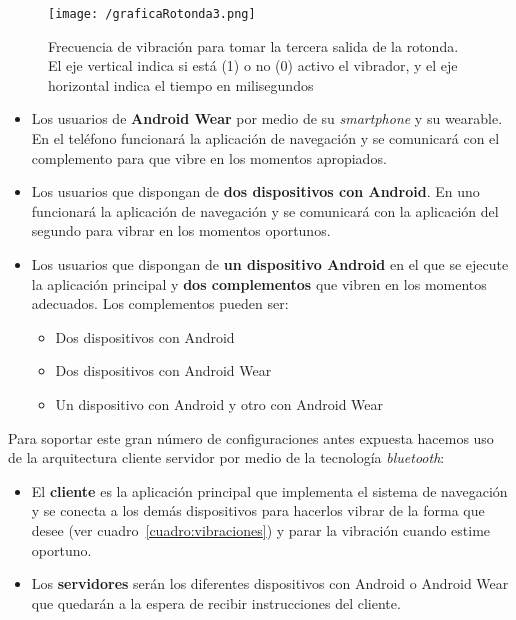 \begin{figure}[!h]
  \begin{center}
    \texttt{[image: /graficaRotonda3.png]}
    \caption{Frecuencia de vibración para tomar la tercera salida de la rotonda. El eje vertical
      indica si está (1) o no (0) activo el vibrador, y el eje horizontal indica el tiempo en
      milisegundos}
    \label{fig:graficaRotonda3}
  \end{center}
\end{figure}

\begin{itemize}
  \item Los usuarios de \textbf{Android Wear} por medio de su \emph{smartphone} y su {wearable}. En
    el teléfono funcionará la aplicación de navegación y se comunicará con el complemento para que
    vibre en los momentos apropiados.

  \item Los usuarios que dispongan de \textbf{dos dispositivos con Android}. En uno funcionará la
    aplicación de navegación y se comunicará con la aplicación del segundo para vibrar en los
    momentos oportunos.

  \item Los usuarios que dispongan de \textbf{un dispositivo Android} en el que se ejecute la
    aplicación principal y \textbf{dos complementos} que vibren en los momentos adecuados. Los
    complementos pueden ser:

    \begin{itemize}
      \item Dos dispositivos con Android
      \item Dos dispositivos con Android Wear
      \item Un dispositivo con Android y otro con Android Wear
    \end{itemize}
\end{itemize}

Para soportar este gran número de configuraciones antes expuesta hacemos uso de la arquitectura
cliente servidor por medio de la tecnología \emph{bluetooth}:

\begin{itemize}
  \item El \textbf{cliente} es la aplicación principal que implementa el sistema de navegación y se
    conecta a los demás dispositivos para hacerlos vibrar de la forma que desee (ver
    cuadro~\ref{cuadro:vibraciones}) y parar la vibración cuando estime oportuno.
  \item Los \textbf{servidores} serán los diferentes dispositivos con Android o Android Wear que
    quedarán a la espera de recibir instrucciones del cliente.
\end{itemize}

